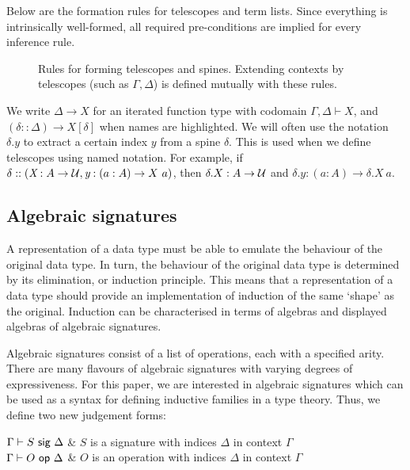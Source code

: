 Below are the formation rules for telescopes and term lists.
Since everything is intrinsically well-formed, all required pre-conditions are
implied for every inference rule.

\begin{figure}[H]
  \caption{Rules for forming telescopes and spines. Extending contexts by
  telescopes (such as $\Gamma, \Delta$) is defined mutually with these rules.}
\end{figure}

We write $\Delta \to X$ for an iterated function type with codomain $\Gamma, \Delta \vdash X$,
and $(\delta :: \Delta) \to X[\delta]$ when names are highlighted.
We will often use the notation $\delta.y$ to extract a certain index $y$ from a
spine $\delta$. This is used when we define telescopes using named notation. For
example, if $\delta :: (\textit{X} : A \to \mathcal{U}, \textit{y} : (a : A) \to X\
a)$, then $\delta.X : A \to \mathcal{U}$ and $\delta.y : (a : A) \to \delta.X\ a$.


\newcommand{\ValidCase}{\mta{ValidCase}}

\subsection{Algebraic signatures}

A representation of a data type must be able to emulate the behaviour of the
original data type. In turn, the behaviour of the original data type is
determined by its elimination, or induction principle. This means that a
representation of a data type should provide an implementation of induction of
the same `shape' as the original. Induction can be characterised in terms of
algebras and displayed algebras of algebraic signatures.

Algebraic signatures \cite{Adamek2010-ls,Kovacs2023-gq} consist of a list of operations, each with a specified
arity. There are many flavours of algebraic signatures with varying degrees of
expressiveness. For this paper, we are interested in algebraic signatures which can
be used as a syntax for defining inductive families in a type theory. Thus, we define
two new judgement forms:
\begin{definitions}
$\Gamma \vdash S \ \textsf{sig}\  \Delta$    & $S$ is a signature with indices $\Delta$ in context $\Gamma$ \\
$\Gamma \vdash O \ \textsf{op}\  \Delta$     & $O$ is an operation with indices $\Delta$ in context $\Gamma$
\end{definitions}

